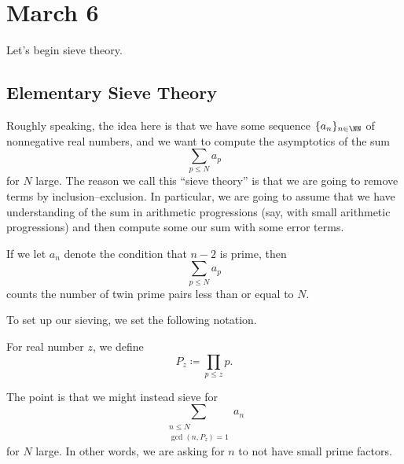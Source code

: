 \documentclass[../notes.tex]{subfiles}
\begin{document}
\section{March 6}

Let's begin sieve theory.

\subsection{Elementary Sieve Theory}
Roughly speaking, the idea here is that we have some sequence $\{a_n\}_{n\in\NN}$ of nonnegative real numbers, and we want to compute the asymptotics of the sum
\[\sum_{p\le N}a_p\]
for $N$ large. The reason we call this ``sieve theory'' is that we are going to remove terms by inclusion--exclusion. In particular, we are going to assume that we have understanding of the sum in arithmetic progressions (say, with small arithmetic progressions) and then compute some our sum with some error terms.
\begin{example}
	If we let $a_n$ denote the condition that $n-2$ is prime, then
	\[\sum_{p\le N}a_p\]
	counts the number of twin prime pairs less than or equal to $N$.
\end{example}
To set up our sieving, we set the following notation.
\begin{notation}
	For real number $z$, we define
	\[P_z\coloneqq\prod_{p\le z}p.\]
\end{notation}
The point is that we might instead sieve for
\[\sum_{\substack{n\le N\\\gcd(n,P_z)=1}}a_n\]
for $N$ large. In other words, we are asking for $n$ to not have small prime factors.
\end{document}
